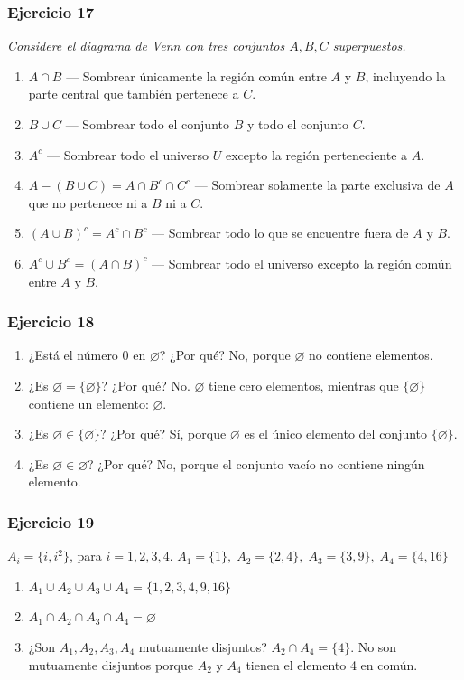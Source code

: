 \documentclass[12pt,a4paper]{article}
\newcommand{\propbox}[1]{\noindent\textcolor{muted}{\small\textit{#1}}\par}
\begin{document}
\subsubsection*{\textcolor{accent}{Ejercicio 17}}
\propbox{Considere el diagrama de Venn con tres conjuntos $A,B,C$ superpuestos.}
\begin{enumerate}[label=17.\alph*]
  \item $A\cap B$ — Sombrear únicamente la región común entre $A$ y $B$, incluyendo la parte central que también pertenece a $C$.
  \item $B\cup C$ — Sombrear todo el conjunto $B$ y todo el conjunto $C$.
  \item $A^c$ — Sombrear todo el universo $U$ excepto la región perteneciente a $A$.
  \item $A-(B\cup C)=A\cap B^c\cap C^c$ — Sombrear solamente la parte exclusiva de $A$ que no pertenece ni a $B$ ni a $C$.
  \item $(A\cup B)^c=A^c\cap B^c$ — Sombrear todo lo que se encuentre fuera de $A$ y $B$.
  \item $A^c\cup B^c=(A\cap B)^c$ — Sombrear todo el universo excepto la región común entre $A$ y $B$.
\end{enumerate}

\subsubsection*{\textcolor{accent}{Ejercicio 18}}
\begin{enumerate}[label=18.\alph*]
  \item ¿Está el número $0$ en $\varnothing$? ¿Por qué? No, porque $\varnothing$ no contiene elementos.
  \item ¿Es $\varnothing=\{\varnothing\}$? ¿Por qué? No. $\varnothing$ tiene cero elementos, mientras que $\{\varnothing\}$ contiene un elemento: $\varnothing$.
  \item ¿Es $\varnothing\in\{\varnothing\}$? ¿Por qué? Sí, porque $\varnothing$ es el único elemento del conjunto $\{\varnothing\}$.
  \item ¿Es $\varnothing\in\varnothing$? ¿Por qué? No, porque el conjunto vacío no contiene ningún elemento.
\end{enumerate}

\subsubsection*{\textcolor{accent}{Ejercicio 19}}
$A_i=\{i,i^2\}$, para $i=1,2,3,4$. $A_1=\{1\},\;A_2=\{2,4\},\;A_3=\{3,9\},\;A_4=\{4,16\}$
\begin{enumerate}[label=19.\alph*]
  \item $A_1\cup A_2\cup A_3\cup A_4=\{1,2,3,4,9,16\}$
  \item $A_1\cap A_2\cap A_3\cap A_4=\varnothing$
  \item ¿Son $A_1,A_2,A_3,A_4$ mutuamente disjuntos? $A_2\cap A_4=\{4\}$. No son mutuamente disjuntos porque $A_2$ y $A_4$ tienen el elemento 4 en común.
\end{enumerate}
\end{document}
